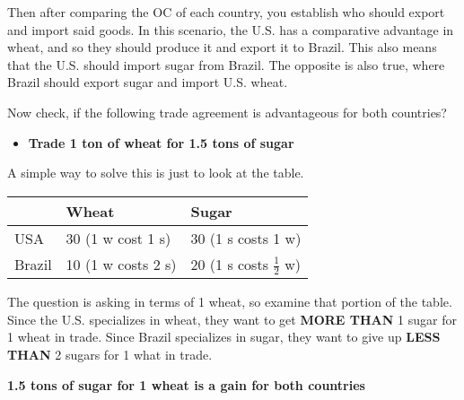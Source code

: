 Then after comparing the OC of each country, you establish who should export and import said goods. In this scenario, the U.S. has a comparative advantage in wheat, and so they should produce it and export it to Brazil. This also means that the U.S. should import sugar from Brazil. The opposite is also true, where Brazil should export sugar and import U.S. wheat. 

\begin{example}
    Now check, if the following trade agreement is advantageous for both countries?
    \begin{itemize}
        \item \textbf{Trade 1 ton of wheat for 1.5 tons of sugar}
    \end{itemize}
    A simple way to solve this is just to look at the table.

\begin{table}[!h]
    \begin{center}
        \begin{tabular}{l|l|l}
            \toprule
            \textbf{} & \textbf{Wheat} & \textbf{Sugar}\\
            \midrule
            USA & 30 (1 w cost 1 s) & 30 (1 s costs 1 w)\\
            Brazil & 10 (1 w costs 2 s) & 20 (1 s costs $\frac{1}{2}$ w)\\
            \bottomrule
        \end{tabular}
    \end{center}
\end{table}
The question is asking in terms of 1 wheat, so examine that portion of the table. Since the U.S. specializes in wheat, they want to get \textbf{MORE THAN} 1 sugar for 1 wheat in trade. Since Brazil specializes in sugar, they want to give up \textbf{LESS THAN} 2 sugars for 1 what in trade. 

\textbf{1.5 tons of sugar for 1 wheat is a gain for both countries}

\end{example}





